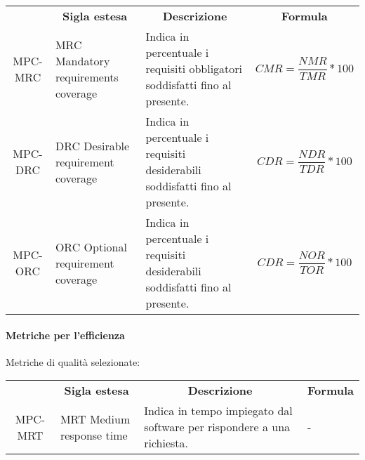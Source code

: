 \begin{table}[H]
    \centering
    \renewcommand{\arraystretch}{1.8}
    \begin{tabular}{| c | p{4.2cm} | p{5cm} | p{2cm} |  }
        \rowcolor[HTML]{a52a2a}
        \multicolumn{1}{c}{\color[HTML]{FFFFFF} \textbf{Codice}}       &
        \multicolumn{1}{c}{\color[HTML]{FFFFFF} \textbf{Sigla estesa}} &
        \multicolumn{1}{c}{\color[HTML]{FFFFFF} \textbf{Descrizione}}  &
        \multicolumn{1}{c}{\color[HTML]{FFFFFF} \textbf{Formula}}                                                                                                                                                                                     \\
        MPC-MRC                                                        & MRC Mandatory requirements coverage & Indica in percentuale i requisiti obbligatori soddisfatti fino al presente.  & \begin{equation} CMR=\frac{NMR}{TMR}*100 \end{equation} \\
        MPC-DRC                                                        & DRC Desirable requirement coverage  & Indica in percentuale i requisiti desiderabili soddisfatti fino al presente. & \begin{equation} CDR=\frac{NDR}{TDR}*100 \end{equation} \\
        MPC-ORC                                                        & ORC Optional requirement coverage   & Indica in percentuale i requisiti desiderabili soddisfatti fino al presente. & \begin{equation} CDR=\frac{NOR}{TOR}*100 \end{equation} \\
        \hline
    \end{tabular}
\end{table}
\paragraph{Metriche per l'efficienza }
Metriche di qualità selezionate:
\begin{table}[H]
    \centering
    \renewcommand{\arraystretch}{1.8}
    \begin{tabular}{| c | p{4.2cm} | p{5cm} | p{2cm} |  }
        \rowcolor[HTML]{a52a2a}
        \multicolumn{1}{c}{\color[HTML]{FFFFFF} \textbf{Codice}}       &
        \multicolumn{1}{c}{\color[HTML]{FFFFFF} \textbf{Sigla estesa}} &
        \multicolumn{1}{c}{\color[HTML]{FFFFFF} \textbf{Descrizione}}  &
        \multicolumn{1}{c}{\color[HTML]{FFFFFF} \textbf{Formula}}                                                                                                              \\
        MPC-MRT                                                        & MRT Medium response time & Indica in tempo impiegato dal software per rispondere a una richiesta. & - \\
        \hline
    \end{tabular}
\end{table}
